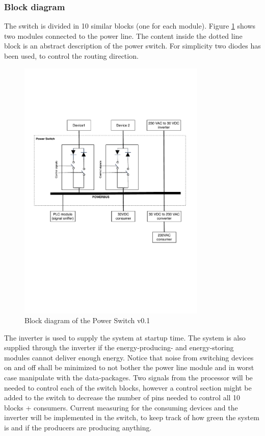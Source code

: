 \subsubsection{Block diagram}
The switch is divided in 10 similar blocks (one for each module). Figure \ref{fig:ps_block_v0_1} shows two modules connected to the power line. The content inside the dotted line block is an abstract description of the power switch. For simplicity two diodes has been used, to control the routing direction.
\begin{figure}[H]
	\begin{centering}
		\includegraphics[width=0.8\textwidth,page=1,angle=0]{images/power_switch_block_diagram_v0_1}
		\caption{Block diagram of the Power Switch v0.1}
		\label{fig:ps_block_v0_1}
	\end{centering}
\end{figure}
The inverter is used to supply the system at startup time. The system is also supplied through the inverter if the energy-producing- and energy-storing modules cannot deliver enough energy. 
\p Notice that noise from switching devices on and off shall be minimized to not bother the power line module and in worst case manipulate with the data-packages. 
\p Two signals from the processor will be needed to control each of the switch blocks, however a control section might be added to the switch to decrease the number of pins needed to control all 10 blocks + consumers. 
\p Current measuring for the consuming devices and the inverter will be implemented in the switch, to keep track of how green the system is and if the producers are producing anything.  
